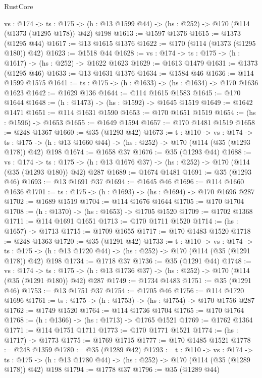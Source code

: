 \begin{lexlean}{RustCore}
\begin{coremodule}
  {vs : @174} ->
  {ts : @175} -> (h : @13 @1599 @44) -> (hs : @252) -> @170 (@114 (@1373 (@1295 @178)) @42) @198
@1613 := @1597 @1376
@1615 := @1373 (@1295 @44)
@1617 := @13 @1615 @1376
@1622 := @170 (@114 (@1373 (@1295 @180)) @42)
@1623 := @1518 @44
@1628 := {vs : @174} -> {ts : @175} -> (h : @1617) -> (hs : @252) -> @1622 @1623
@1629 := @1613 @1479
@1631 := @1373 (@1295 @46)
@1633 := @13 @1631 @1376
@1634 := @1584 @46
@1636 := @114 @1599 @1575
@1641 := {ts : @175} -> (h : @1633) -> (hs : @1634) -> @170 @1636 @1623
@1642 := @1629 @136
@1644 := @114 @1615 @1583
@1645 := @170 @1644
@1648 := (h : @1473) -> (hs : @1592) -> @1645 @1519
@1649 := @1642 @1471
@1651 := @114 @1631 @1590
@1653 := @170 @1651 @1519
@1654 := (hs : @1596) -> @1653
@1655 := @1649 @1594
@1657 := @170 @1481 @1519
@1658 := @248 @1367
@1660 := @35 (@1293 @42)
@1673 := {t : @110} ->
  {vs : @174} ->
  {ts : @175} -> (h : @13 @1660 @44) -> (hs : @252) -> @170 (@114 (@35 (@1293 @178)) @42) @198
@1674 := @1658 @37
@1676 := @35 (@1293 @44)
@1688 := {vs : @174} ->
  {ts : @175} -> (h : @13 @1676 @37) -> (hs : @252) -> @170 (@114 (@35 (@1293 @180)) @42) @287
@1689 := @1674 @1481
@1691 := @35 (@1293 @46)
@1693 := @13 @1691 @37
@1694 := @1645 @46
@1696 := @114 @1660 @1636
@1701 := {ts : @175} -> (h : @1693) -> (hs : @1694) -> @170 @1696 @287
@1702 := @1689 @1519
@1704 := @114 @1676 @1644
@1705 := @170 @1704
@1708 := (h : @1370) -> (hs : @1653) -> @1705 @1520
@1709 := @1702 @1368
@1711 := @114 @1691 @1651
@1713 := @170 @1711 @1520
@1714 := (hs : @1657) -> @1713
@1715 := @1709 @1655
@1717 := @170 @1483 @1520
@1718 := @248 @1363
@1720 := @35 (@1291 @42)
@1733 := {t : @110} ->
  {vs : @174} ->
  {ts : @175} -> (h : @13 @1720 @44) -> (hs : @252) -> @170 (@114 (@35 (@1291 @178)) @42) @198
@1734 := @1718 @37
@1736 := @35 (@1291 @44)
@1748 := {vs : @174} ->
  {ts : @175} -> (h : @13 @1736 @37) -> (hs : @252) -> @170 (@114 (@35 (@1291 @180)) @42) @287
@1749 := @1734 @1483
@1751 := @35 (@1291 @46)
@1753 := @13 @1751 @37
@1754 := @1705 @46
@1756 := @114 @1720 @1696
@1761 := {ts : @175} -> (h : @1753) -> (hs : @1754) -> @170 @1756 @287
@1762 := @1749 @1520
@1764 := @114 @1736 @1704
@1765 := @170 @1764
@1768 := (h : @1366) -> (hs : @1713) -> @1765 @1521
@1769 := @1762 @1364
@1771 := @114 @1751 @1711
@1773 := @170 @1771 @1521
@1774 := (hs : @1717) -> @1773
@1775 := @1769 @1715
@1777 := @170 @1485 @1521
@1778 := @248 @1359
@1780 := @35 (@1289 @42)
@1793 := {t : @110} ->
  {vs : @174} ->
  {ts : @175} -> (h : @13 @1780 @44) -> (hs : @252) -> @170 (@114 (@35 (@1289 @178)) @42) @198
@1794 := @1778 @37
@1796 := @35 (@1289 @44)

\end{coremodule}
\end{lexlean}
